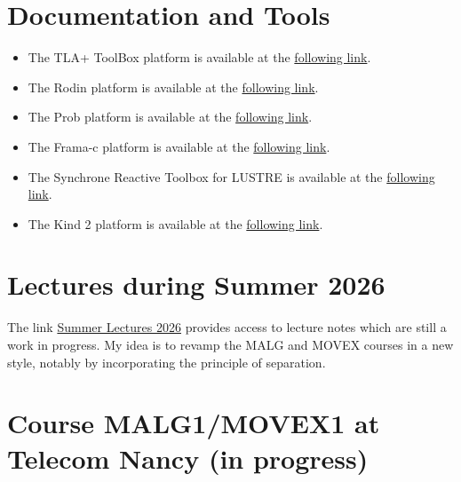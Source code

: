 \documentclass[ 12pt]{article}
\begin{document}
\tableofcontents


\section{Documentation and Tools}

\begin{itemize}

    
\item[]  The  TLA+ ToolBox  platform is available at the 
  \href{https://lamport.azurewebsites.net/tla/toolbox.html}{following 
    link}. 
\item[]  The Rodin platform is available at the 
  \href{https://www.event-b.org/install.html}{following 
    link}.

  
  \item[]  The Prob   platform is available at the 
  \href{https://prob.hhu.de}{following 
    link}. 

  
  \item[]  The Frama-c platform is available at the 
  \href{https://www.frama-c.com}{following 
    link}.

  \item[]  The Synchrone Reactive Toolbox for LUSTRE is   available at the 
  \href{https://www-verimag.imag.fr/Outils-SynchronesNEW.html?lang=en}{following 
    link}.

  \item[]  The Kind 2  platform is available at the 
  \href{ https://kind2-mc.github.io/kind2/}{following 
    link}.

  
\end{itemize}


\section{Lectures   during Summer 2026}
\label{sec:lect-during-summ}


The link \href{http://mery54.github.io/teaching/movex/lecturesnotes/summertalk.pdf}{Summer
   Lectures 2026}  provides access to lecture notes     which are
 still   a work   in   progress.  My idea is to revamp the MALG
 and MOVEX courses in a new style, notably by incorporating the
 principle of separation.


\section{Course MALG1/MOVEX1 at Telecom Nancy (in progress)}
\label{sec:course-mcfsi-at}
\end{document}
